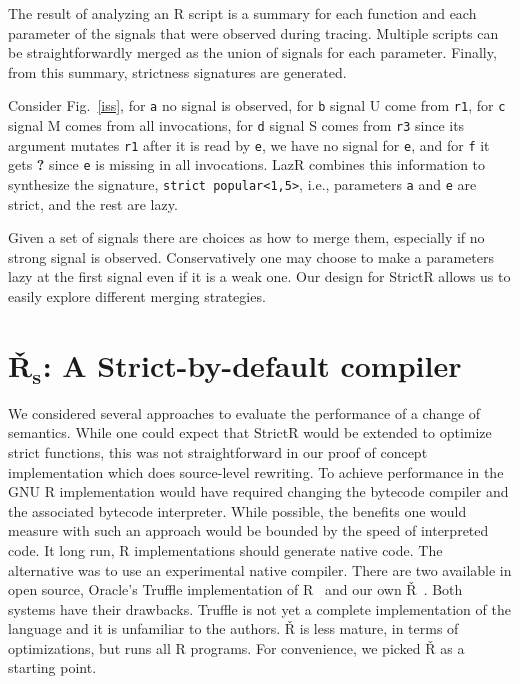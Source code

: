 \documentclass[review,creen,acmsmall]{acmart}
\renewcommand{\c}[1]{\lstinline |#1|\xspace}
\newcommand{\strictr}{{\sf StrictR}\xspace}
\newcommand{\lazr}{{\sf LazR}\xspace}
\renewcommand{\Rsh}{{\sf\v R}\xspace}
\begin{document}
The result of analyzing an R script is a summary for each function and each
parameter of the signals that were observed during tracing. Multiple scripts can
be straightforwardly merged as the union of signals for each parameter. Finally,
from this summary, strictness signatures are generated.

Consider Fig.~\ref{iss}, for \c{a} no signal is observed, for \c{b} signal U
come from \c{r1}, for \c{c} signal M comes from all invocations, for \c{d}
signal S comes from \c{r3} since its argument mutates \c{r1} after it is read by
\c{e}, we have no signal for \c{e}, and for \c{f} it gets \textbf{?} since \c
e is missing in all invocations. \lazr combines this information to synthesize
the signature, \texttt{strict popular<1,5>}, i.e., parameters \c{a} and \c{e}
are strict, and the rest are lazy.

Given a set of signals there are choices as how to merge them, especially if no
strong signal is observed. Conservatively one may choose to make a parameters
lazy at the first signal even if it is a weak one. Our design for \strictr
allows us to easily explore different merging strategies.

\section{\v R$_{\mathbf s}$: A Strict-by-default compiler}\label{sec:rsh1}

We considered several approaches to evaluate the performance of a change of
semantics. While one could expect that \strictr would be extended to optimize
strict functions, this was not straightforward in our proof of concept
implementation which does source-level rewriting. To achieve performance in the
GNU R implementation would have required changing the bytecode compiler and the
associated bytecode interpreter. While possible, the benefits one would measure
with such an approach would be bounded by the speed of interpreted code. It long
run, R implementations should generate native code. The alternative was to use
an experimental native compiler. There are two available in open source,
Oracle's Truffle implementation of R~\cite{Stadler16} and our own
\Rsh~\cite{dls19}. Both systems have their drawbacks. Truffle is not yet a
complete implementation of the language and it is unfamiliar to the authors.
\Rsh is less mature, in terms of optimizations, but runs all R programs. For
convenience, we picked \Rsh as a starting point.
\end{document}
